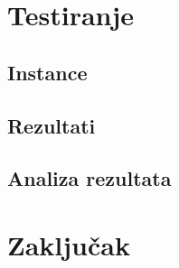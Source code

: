\documentclass[a4paper]{article}
\begin{document}
\section{Testiranje}
\subsection{Instance}
\subsection{Rezultati}
\subsection{Analiza rezultata}
\section{Zaključak}


\appendix
 

\end{document}
